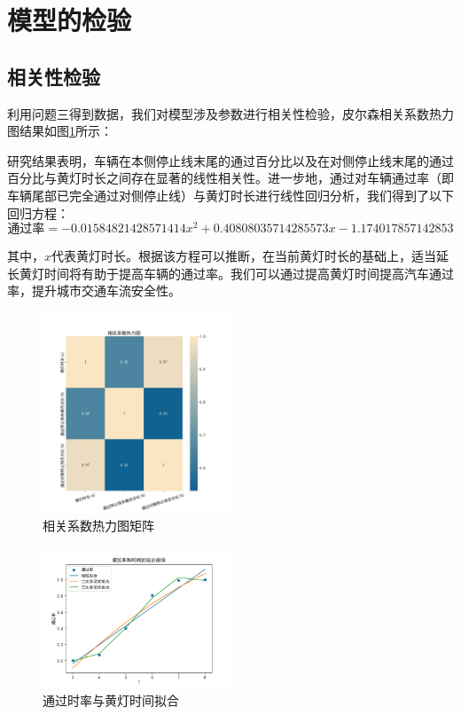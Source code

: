 \documentclass[withoutpreface,bwprint]{cumcmthesis}
\begin{document}
\section{模型的检验}
\subsection{相关性检验}
利用问题三得到数据，我们对模型涉及参数进行相关性检验，皮尔森相关系数热力图结果如图\ref{fig:cos}所示：

研究结果表明，车辆在本侧停止线末尾的通过百分比以及在对侧停止线末尾的通过百分比与黄灯时长之间存在显著的线性相关性。进一步地，通过对车辆通过率（即车辆尾部已完全通过对侧停止线）与黄灯时长进行线性回归分析，我们得到了以下回归方程：$$\text{通过率} = -0.01584821428571414x^2+0.40808035714285573x-1.174017857142853$$

其中，$x$代表黄灯时长。根据该方程可以推断，在当前黄灯时长的基础上，适当延长黄灯时间将有助于提高车辆的通过率。我们可以通过提高黄灯时间提高汽车通过率，提升城市交通车流安全性。
\begin{figure}[htbp!]
		\centering
		\includegraphics[width=0.5\textwidth]{pics/corres}
		\caption{相关系数热力图矩阵}
		\label{fig:cos}
\end{figure}
\begin{figure}[htbp!]
	\centering
	\includegraphics[width=0.5\textwidth]{pics/linear}
	\caption{通过时率与黄灯时间拟合}
	\label{fig:linear}
\end{figure}
\end{document}
